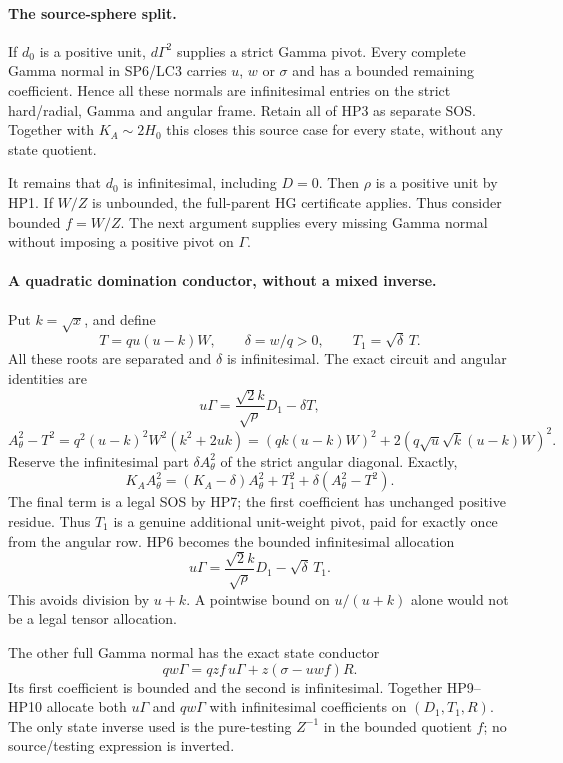 \paragraph{The source-sphere split.}
If $d_0$ is a positive unit, $d\Gamma^2$ supplies a strict Gamma
pivot.  Every complete Gamma normal in SP6/LC3 carries $u$, $w$
or $\sigma$ and has a bounded remaining coefficient.  Hence all
these normals are infinitesimal entries on the strict hard/radial,
Gamma and angular frame.  Retain all of HP3 as separate SOS.
Together with $K_A\sim2H_0$ this closes this source case for every
state, without any state quotient.

It remains that $d_0$ is infinitesimal, including $D=0$.
Then $\rho$ is a positive unit by HP1.  If $W/Z$ is unbounded,
the full-parent HG certificate applies.  Thus consider bounded
$f=W/Z$.  The next argument supplies every missing Gamma normal
without imposing a positive pivot on $\Gamma$.

\paragraph{A quadratic domination conductor, without a mixed inverse.}
Put $k=\sqrt x$, and define
\[
 T=q u(u-k)W,\qquad \delta=w/q>0,
 \qquad T_1=\sqrt\delta\,T.
\]
All these roots are separated and $\delta$ is infinitesimal.
The exact circuit and angular identities are
\[
 u\Gamma=\frac{\sqrt2 k}{\sqrt\rho}D_1-\delta T,
 \tag{HP6}
\]
\[
 A_\theta^2-T^2
   =q^2(u-k)^2W^2(k^2+2uk)
   =(qk(u-k)W)^2+2(q\sqrt u\sqrt k(u-k)W)^2.
 \tag{HP7}
\]
Reserve the infinitesimal part $\delta A_\theta^2$ of the strict
angular diagonal.  Exactly,
\[
 K_A A_\theta^2=(K_A-\delta)A_\theta^2
         +T_1^2+\delta(A_\theta^2-T^2).
 \tag{HP8}
\]
The final term is a legal SOS by HP7; the first coefficient has
unchanged positive residue.  Thus $T_1$ is a genuine additional
unit-weight pivot, paid for exactly once from the angular row.
HP6 becomes the bounded infinitesimal allocation
\[
 u\Gamma=\frac{\sqrt2 k}{\sqrt\rho}D_1
                   -\sqrt\delta\,T_1.
 \tag{HP9}
\]
This avoids division by $u+k$.  A pointwise bound on
$u/(u+k)$ alone would not be a legal tensor allocation.

The other full Gamma normal has the exact state conductor
\[
 qw\Gamma=qzf\,u\Gamma+z(\sigma-uwf)R.
 \tag{HP10}
\]
Its first coefficient is bounded and the second is infinitesimal.
Together HP9--HP10 allocate both $u\Gamma$ and $qw\Gamma$ with
infinitesimal coefficients on $(D_1,T_1,R)$.  The only state
inverse used is the pure-testing $Z^{-1}$ in the bounded quotient
$f$; no source/testing expression is inverted.


